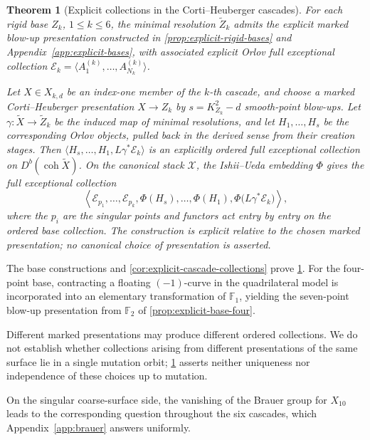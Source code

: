 \documentclass[11pt]{article}
\theoremstyle{plain}
\newtheorem{theorem}{Theorem}[section]
\theoremstyle{definition}
\theoremstyle{remark}
\newcommand{\F}{\mathbb F}
\newcommand{\Db}{D^b}
\newcommand{\coh}{\operatorname{coh}}
\newcommand{\XX}{\mathcal X}
\begin{document}
\begin{theorem}[Explicit collections in the Corti--Heuberger cascades]
\label{thm:explicit-cascades-main}
For each rigid base \(Z_k\), \(1\leq k\leq6\), the minimal resolution
\(\widetilde Z_k\) admits the explicit marked blow-up presentation
constructed in \cref{prop:explicit-rigid-bases} and
Appendix~\ref{app:explicit-bases}, with associated explicit Orlov full
exceptional collection
\(\mathscr E_k=\langle A^{(k)}_1,\ldots,A^{(k)}_{N_k}\rangle\).

Let \(X\in X_{k,d}\) be an index-one member of the \(k\)-th cascade,
and choose a marked Corti--Heuberger presentation \(X\to Z_k\) by
\(s=K_{Z_k}^2-d\) smooth-point blow-ups. Let
\(\gamma:\widetilde X\to\widetilde Z_k\) be the induced map of
minimal resolutions, and let \(H_1,\ldots,H_s\) be the corresponding
Orlov objects, pulled back in the derived sense from their creation
stages. Then
\(\langle H_s,\ldots,H_1,L\gamma^*\mathscr E_k\rangle\)
is an explicitly ordered full exceptional collection on
\(\Db(\coh\widetilde X)\). On the canonical stack \(\XX\), the
Ishii--Ueda embedding \(\Phi\) gives the full exceptional collection
\[
\left\langle
\mathcal E_{p_1},\ldots,\mathcal E_{p_k},
\Phi(H_s),\ldots,\Phi(H_1),
\Phi\bigl(L\gamma^*\mathscr E_k\bigr)
\right\rangle,
\]
where the \(p_i\) are the singular points and functors act entry by
entry on the ordered base collection. The construction is explicit
relative to the chosen marked presentation; no canonical choice of
presentation is asserted.
\end{theorem}

The base constructions and \cref{cor:explicit-cascade-collections}
prove \cref{thm:explicit-cascades-main}. For the four-point base,
contracting a floating \((-1)\)-curve in the quadrilateral model is
incorporated into an elementary transformation of \(\F_1\), yielding
the seven-point blow-up presentation from \(\F_2\) of
\cref{prop:explicit-base-four}.

Different marked presentations may produce different ordered collections.
We do not establish whether collections arising from different
presentations of the same surface lie in a single mutation orbit;
\cref{thm:explicit-cascades-main} asserts neither uniqueness nor
independence of these choices up to mutation.

On the singular coarse-surface side, the vanishing of the Brauer group
for \(X_{10}\) leads to the corresponding question throughout the six
cascades, which Appendix~\ref{app:brauer} answers uniformly.
\end{document}
